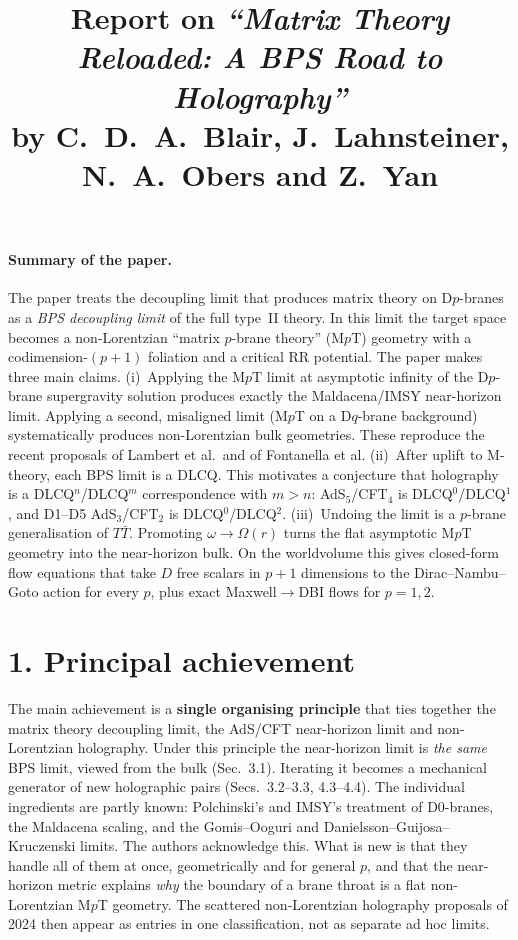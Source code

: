 \documentclass[11pt,a4paper]{article}
\title{Report on \emph{``Matrix Theory Reloaded: A BPS Road to Holography''}\\[2pt]
\large by C.~D.~A.~Blair, J.~Lahnsteiner, N.~A.~Obers and Z.~Yan}
\date{}
\begin{document}
\maketitle
\vspace{-1.5em}

\paragraph{Summary of the paper.}
The paper treats the decoupling limit that produces matrix theory on D$p$-branes as a
\emph{BPS decoupling limit} of the full type~II theory. In this limit the target space
becomes a non-Lorentzian ``matrix $p$-brane theory'' (M$p$T) geometry with a
codimension-$(p+1)$ foliation and a critical RR potential. The paper makes three main claims.
(i)~Applying the M$p$T limit at asymptotic infinity of the D$p$-brane supergravity
solution produces exactly the Maldacena/IMSY near-horizon limit. Applying a second, misaligned
limit (M$p$T on a D$q$-brane background) systematically produces non-Lorentzian bulk geometries.
These reproduce the recent proposals of Lambert et al.\ and of Fontanella et al.
(ii)~After uplift to M-theory, each BPS limit is a DLCQ. This motivates a conjecture that
holography is a DLCQ$^n$/DLCQ$^m$ correspondence with $m>n$: AdS$_5$/CFT$_4$ is
DLCQ$^0$/DLCQ$^1$, and D1--D5 AdS$_3$/CFT$_2$ is DLCQ$^0$/DLCQ$^2$.
(iii)~Undoing the limit is a $p$-brane generalisation of $T\bar T$. Promoting $\omega\to\mathbb{\Omega}(r)$
turns the flat asymptotic M$p$T geometry into the near-horizon bulk. On the worldvolume this gives
closed-form flow equations that take $D$ free scalars in $p+1$ dimensions to the
Dirac--Nambu--Goto action for every $p$, plus exact Maxwell$\to$DBI flows for $p=1,2$.

\section*{1. Principal achievement}
The main achievement is a \textbf{single organising principle} that ties together the matrix
theory decoupling limit, the AdS/CFT near-horizon limit and non-Lorentzian holography.
Under this principle the near-horizon limit is \emph{the same} BPS limit, viewed from the
bulk (Sec.~3.1). Iterating it becomes a mechanical generator of new holographic pairs
(Secs.~3.2--3.3, 4.3--4.4). The individual ingredients are partly known: Polchinski's and
IMSY's treatment of D0-branes, the Maldacena scaling, and the Gomis--Ooguri and
Danielsson--Guijosa--Kruczenski limits. The authors acknowledge this. What is new is that they
handle all of them at once, geometrically and for general $p$, and that the near-horizon metric
explains \emph{why} the boundary of a brane throat is a flat non-Lorentzian M$p$T geometry.
The scattered non-Lorentzian holography proposals of 2024 then appear as entries in one
classification, not as separate ad hoc limits.
\end{document}
